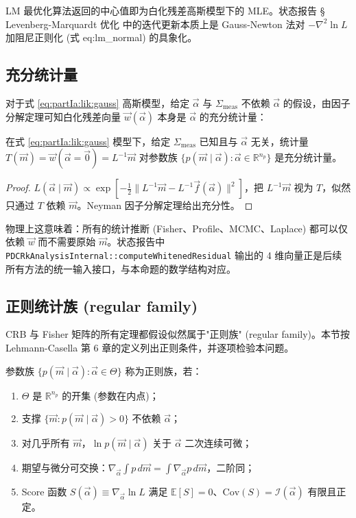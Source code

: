 LM 最优化算法返回的中心值即为白化残差高斯模型下的 MLE。状态报告 § Levenberg-Marquardt 优化 中的迭代更新本质上是 Gauss-Newton 法对 $-\nabla^2\ln L$ 加阻尼正则化 (式 \StatusReport eq:lm\_normal) 的具象化。

\subsection{充分统计量}
\label{sec:partIa:lik:sufficiency}

对于式 \eqref{eq:partIa:lik:gauss} 高斯模型，给定 $\vec\alpha$ 与 $\Sigma_\mathrm{meas}$ 不依赖 $\vec\alpha$ 的假设，由因子分解定理可知白化残差向量 $\vec w(\vec\alpha)$ 本身是 $\vec\alpha$ 的充分统计量：
\begin{proposition}[白化残差充分性]\label{prop:partIa:suff}
  在式 \eqref{eq:partIa:lik:gauss} 模型下，给定 $\Sigma_\mathrm{meas}$ 已知且与 $\vec\alpha$ 无关，统计量 $T(\vec m)=\vec w(\vec\alpha=\vec 0)=L^{-1}\vec m$ 对参数族 $\{p(\vec m\mid\vec\alpha):\vec\alpha\in\mathbb R^{n_p}\}$ 是充分统计量。
\end{proposition}
\begin{proof}
  $L(\vec\alpha\mid\vec m)\propto\exp[-\tfrac12\|L^{-1}\vec m-L^{-1}\vec f(\vec\alpha)\|^2]$，把 $L^{-1}\vec m$ 视为 $T$，似然只通过 $T$ 依赖 $\vec m$。Neyman 因子分解定理给出充分性。
\end{proof}

物理上这意味着：所有的统计推断 (Fisher、Profile、MCMC、Laplace) 都可以仅依赖 $\vec w$ 而不需要原始 $\vec m$。状态报告中 \texttt{PDCRkAnalysisInternal::computeWhitenedResidual} 输出的 4 维向量正是后续所有方法的统一输入接口，与本命题的数学结构对应。

\subsection{正则统计族 (regular family)}
\label{sec:partIa:lik:regular}

CRB 与 Fisher 矩阵的所有定理都假设似然属于"正则族" (regular family)。本节按 Lehmann-Casella 第 6 章的定义列出正则条件，并逐项检验本问题。

\begin{definition}[正则族]\label{def:partIa:regular}
  参数族 $\{p(\vec m\mid\vec\alpha):\vec\alpha\in\Theta\}$ 称为正则族，若：
  \begin{enumerate}[label=(R\arabic*),nosep]
    \item $\Theta$ 是 $\mathbb R^{n_p}$ 的开集 (参数在内点)；
    \item 支撑 $\{\vec m: p(\vec m\mid\vec\alpha)>0\}$ 不依赖 $\vec\alpha$；
    \item 对几乎所有 $\vec m$，$\ln p(\vec m\mid\vec\alpha)$ 关于 $\vec\alpha$ 二次连续可微；
    \item 期望与微分可交换：$\nabla_{\vec\alpha}\int p\,d\vec m=\int\nabla_{\vec\alpha}p\,d\vec m$，二阶同；
    \item Score 函数 $S(\vec\alpha)\equiv\nabla_{\vec\alpha}\ln L$ 满足 $\mathbb E[S]=0$、$\mathrm{Cov}(S)=\mathcal I(\vec\alpha)$ 有限且正定。
  \end{enumerate}
\end{definition}

